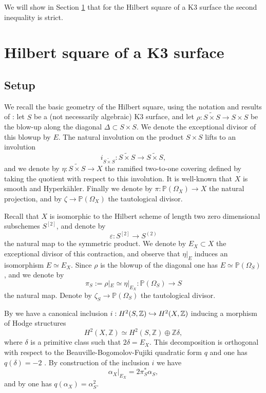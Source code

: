 \documentclass[JEP,XML,SOM,Unicode,NoEqCountersInSection,published]{cedram}
\newcommand\hto{\mathrel{\lhook\joinrel\to}}
\theoremstyle{plain}
\theoremstyle{definition}
\newcommand{\Z}{\ensuremath{\mathbb{Z}}}
\newcommand{\PP}{\ensuremath{\mathbb{P}}}
\newcommand{\holom}[3]{\ensuremath{#1:#2\to #3}}
\newcommand{\blS}{\ensuremath{\widetilde{S \times S}}}
\begin{document}
We will show in Section \ref{sectionK3square} that for the Hilbert square of a K3 surface the second inequality is strict.

\section{Hilbert square of a K3 surface} \label{sectionK3square}

\subsection{Setup}
\label{subsectionsetup}

We recall the basic geometry of the Hilbert square, using the notation and results of \cite[\S 6]{Bea83}:
let $S$ be a (not necessarily algebraic) K3 surface, and let $\holom{\rho}{\widetilde{S \times S}}{S \times S}$ be the blow-up along the diagonal $\Delta \subset S \times S$. We denote the exceptional divisor of this blowup by $E$.
The natural involution on the product $S \times S$ lifts to an involution
\[
i_{\blS}: \blS \to \blS,
\]
and we denote by
$\holom{\eta}{\blS}{X}$ the ramified two-to-one covering defined by taking the quotient with respect to this involution.
It is well-known that $X$ is smooth and Hyperkähler.
Finally we denote by $\holom{\pi}{\PP(\Omega_X)}{X}$ the natural projection, and by $\zeta \to \PP(\Omega_X)$
the tautological divisor.

Recall that $X$ is isomorphic to the Hilbert scheme of length two zero dimensional subschemes $S^{[2]}$, and denote by
\[
\holom{\varepsilon}{S^{[2]}}{S^{(2)}}
\]
the natural map to the symmetric product. We denote by $E_X \subset X$ the exceptional
divisor of this contraction, and observe that $\eta|_E$ induces an isomorphism $E \simeq E_X$.
Since $\rho$ is the blowup of the diagonal one has
$E \simeq \PP(\Omega_S)$, and we denote by
\[
\pi_S:= \rho|_E \simeq \eta|_{E_X}: \PP(\Omega_S) \to S
\]
the natural map. Denote by $\zeta_S \to \PP(\Omega_S)$ the tautological divisor.

By \cite[\S 6, Prop.\,6]{Bea83} we have a canonical inclusion
$i: H^2(S, \Z) \hto H^2(X, \Z)$ inducing a morphism of Hodge structures
\[
H^2(X, \Z) \simeq H^2(S, \Z) \oplus \Z \delta,
\]
where $\delta$ is a primitive class such that $2 \delta = E_X$.
This decomposition is orthogonal with respect to the Beauville-Bogomolov-Fujiki quadratic form $q$ \cite[\S 9, Lem.\,1]{Bea83}
and one has $q(\delta)=-2$ \cite[\S 1, Rem.\,1]{Bea83}.
By construction of the inclusion $i$ \cite[\S 6, Prop.\,6]{Bea83}
we have
\begin{equation} \label{restrictalphaX}
\alpha_X|_{E_X} = 2 \pi_S^* \alpha_S,
\end{equation}
and by \cite[\S 9, Rem.\,1]{Bea83} one has $q(\alpha_X)=\alpha_S^2$.
\end{document}
